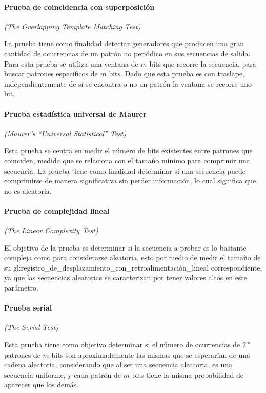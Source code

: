 \paragraph{Prueba de coincidencia con superposición} %
\textit{(The Overlapping Template Matching Test)}

La prueba tiene como finalidad detectar generadores que producen una gran 
cantidad de ocurrencias de un patrón no periódico en sus secuencias de salida. 
Para esta prueba se utiliza una ventana de $m$ bits que recorre la secuencia, 
para buscar patrones específicos de $m$ bits. Dado que esta prueba es con 
traslape, independientemente de si se encontra o no un patrón la ventana se 
recorre uno bit.

\paragraph{Prueba estadística universal de Maurer} %
\textit{(Maurer’s “Universal Statistical” Test)}

Esta prueba se centra en medir el número de bits existentes entre patrones 
que coinciden, medida que se relaciona con el tamaño mínimo para comprimir 
una secuencia. La prueba tiene como finalidad determinar si una secuencia 
puede comprimirse de manera significativa sin perder información, lo cual 
significa que no es aleatoria. 

\paragraph{Prueba de complejidad lineal} %
\textit{(The Linear Complexity Test)}

El objetivo de la prueba es determinar si la secuencia a probar es lo bastante 
compleja como para considerarse aleatoria, esto por medio de medir el tamaño de 
su \gls{gl:registro_de_desplazamiento_con_retroalimentación_lineal} 
correspondiente, ya que las secuencias aleatorias se caracterizan por tener 
valores altos en este parámetro.

\paragraph{Prueba serial} %
\textit{(The Serial Test)}

Esta prueba tiene como objetivo determinar si el número de ocurrencias de 
$2^m$ patrones de $m$ bits son aproximadamente las mismas que se esperarían 
de una cadena aleatoria, considerando que al ser una secuencia aleatoria, 
es una secuencia uniforme, y cada patrón de $m$ bits tiene la misma 
probabilidad de aparecer que los demás.

